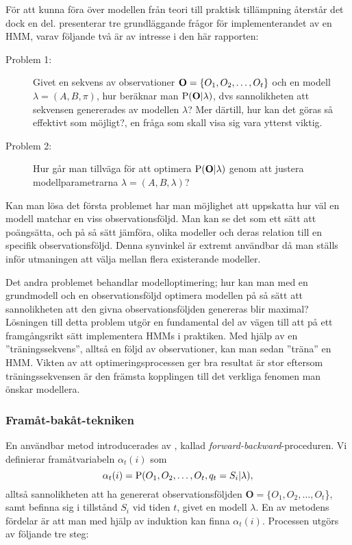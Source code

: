 \documentclass[../rapport_MVEX01-11-05]{subfiles}
\begin{document}
För att kunna föra över modellen från teori till praktisk tillämpning
återstår det dock en del.  presenterar
tre grundläggande frågor för implementerandet av en HMM, varav följande
två är av intresse i den här rapporten:
\begin{description}
\item[Problem 1:] Givet en sekvens av observationer
  $\mathbf{O}=\{O_1,O_2,\dots,O_t\}$ och en modell $\lambda = (A,B,\pi)$, hur
  beräknar man $\mathrm{P}(\mathbf{O}|\lambda)$, dvs sannolikheten att
  sekvensen genererades av modellen $\lambda$? Mer därtill, hur kan
  det göras så effektivt som möjligt?, en fråga som skall visa sig
  vara ytterst viktig.  
\item[Problem 2:] Hur går man tillväga för att optimera
  $\mathrm{P}(\mathbf{O}|\lambda)$ genom att justera
  modellparametrarna $\lambda = (A,B,\lambda)$? 
\end{description}

Kan man lösa det första problemet har man möjlighet att uppskatta hur
väl en modell matchar en viss observationsföljd. Man kan se det som
ett sätt att poängsätta, och på så sätt jämföra, olika modeller och
deras relation till en specifik observationsföljd. Denna synvinkel är
extremt användbar då man ställs inför utmaningen att välja mellan
flera existerande modeller. 

Det andra problemet behandlar modelloptimering; hur kan man med en
grundmodell och en observationsföljd optimera modellen på så sätt att
sannolikheten att den givna observationsföljden genereras blir
maximal? Lösningen till detta problem utgör en fundamental del av
vägen till att på ett framgångsrikt sätt implementera HMMs i
praktiken. Med hjälp av en ''träningssekvens'', alltså en följd av
observationer, kan man sedan ''träna'' en HMM. Vikten av att
optimeringsprocessen ger bra resultat är stor eftersom
träningssekvensen är den främsta kopplingen till det verkliga fenomen
man önskar modellera.      

\subsubsection{Framåt-bakåt-tekniken}

En användbar metod introducerades av , kallad
\emph{forward-backward}-proceduren. Vi
definierar framåtvariabeln $\alpha_t(i)$ som 
\begin{equation*}
\alpha_t(i) = \mathrm{P}(O_1,O_2,\dots,O_t,q_t = S_i | \lambda),
\end{equation*}
alltså sannolikheten att ha genererat observationsföljden $\textbf{O}
= \{O_1,O_2,\dots,O_t$\}, samt befinna sig i tillstånd $S_i$ vid tiden
$t$, givet en modell $\lambda$. En av metodens fördelar är att man med
hjälp av induktion kan finna $\alpha_t(i)$. Processen utgörs av
följande tre steg: 
\end{document}
